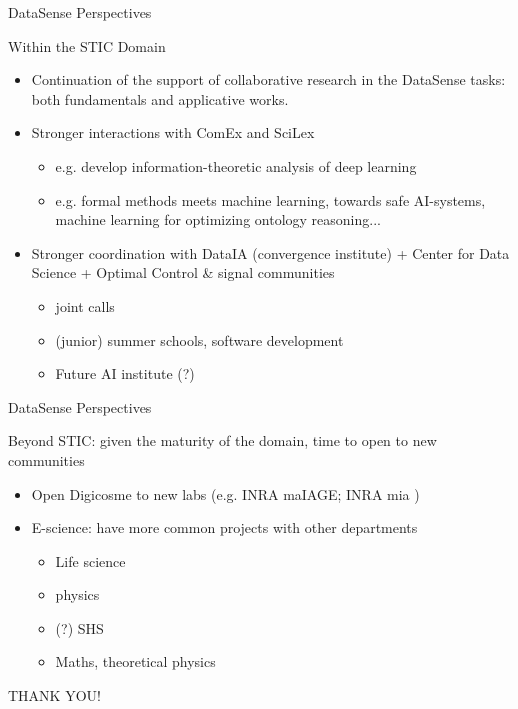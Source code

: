 \begin{frame}{DataSense Perspectives}

Within the STIC Domain

\begin{itemize}
\item Continuation of the support of collaborative research in the DataSense tasks: both fundamentals and applicative works.
\item Stronger interactions with ComEx and SciLex
  \begin{itemize}
  \item e.g. develop information-theoretic analysis of deep learning
  \item e.g. formal methods meets machine learning, towards safe AI-systems, machine learning for optimizing ontology reasoning...
  \end{itemize}
\item Stronger coordination with DataIA (convergence institute) + Center for Data Science + Optimal Control \& signal communities
  \begin{itemize}
  \item joint calls
  \item (junior) summer schools, software development
  \item Future AI institute (?)
  \end{itemize}
\end{itemize}
\end{frame}


\begin{frame}{DataSense Perspectives}

Beyond STIC: given the maturity of the domain, time to open to new communities

\begin{itemize}
\item Open Digicosme to new labs (e.g. INRA maIAGE; INRA mia )
\item E-science: have more common projects with  other departments
  \begin{itemize}
  \item Life science
  \item physics
  \item (?) SHS
  \item Maths, theoretical physics
  \end{itemize}
\end{itemize}

\end{frame}

\begin{frame}[plain]{}

  \vfill
  \begin{center}
    \huge THANK YOU!
  \end{center}
  \vfill

\end{frame}

